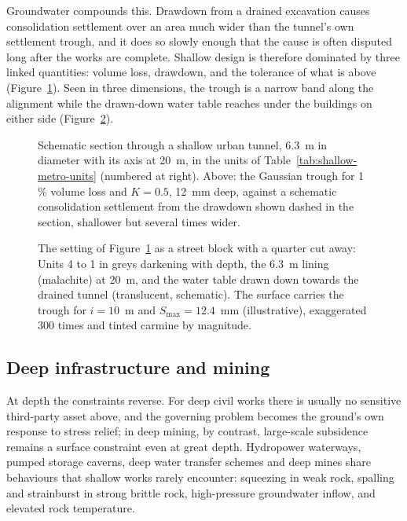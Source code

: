 Groundwater compounds this. Drawdown from a drained excavation causes
consolidation settlement over an area much wider than the tunnel's own
settlement trough, and it does so slowly enough that the cause is often
disputed long after the works are complete. Shallow design is therefore
dominated by three linked quantities: volume loss, drawdown, and the tolerance
of what is above (Figure~\ref{fig:chal-shallow-setting}). Seen in three
dimensions, the trough is a narrow band along the alignment while the drawn-down
water table reaches under the buildings on either side
(Figure~\ref{fig:r3d-shallow-block}).

\begin{figure}[htbp]
\centering
{}
\caption{Schematic section through a shallow urban tunnel, 6.3~m in diameter
with its axis at 20~m, in the units of Table~\ref{tab:shallow-metro-units}
(numbered at right). Above: the Gaussian trough for 1\,\% volume loss and
$K = 0.5$, 12~mm deep, against a schematic consolidation settlement from the
drawdown shown dashed in the section, shallower but several times wider.}
\label{fig:chal-shallow-setting}
\end{figure}

\begin{figure}[htbp]
\centering
{}
\caption{The setting of Figure~\ref{fig:chal-shallow-setting} as a street block
with a quarter cut away: Units 4 to 1 in greys darkening with depth, the 6.3~m
lining (malachite) at 20~m, and the water table drawn down towards the drained
tunnel (translucent, schematic). The surface carries the trough for $i = 10$~m
and $S_{\max} = 12.4$~mm (illustrative), exaggerated 300 times and tinted
carmine by magnitude.}
\label{fig:r3d-shallow-block}
\end{figure}

\subsection{Deep infrastructure and mining}
\label{sec:deep-setting}

At depth the constraints reverse. For deep civil works there is usually no
sensitive third-party asset above, and the governing problem becomes the
ground's own response to stress relief; in deep mining, by contrast,
large-scale subsidence remains a surface constraint even at great depth.
Hydropower waterways, pumped storage caverns, deep water
transfer schemes and deep mines share behaviours that shallow works rarely
encounter: squeezing in weak rock, spalling and strainburst in strong brittle
rock, high-pressure groundwater inflow, and elevated rock temperature.

